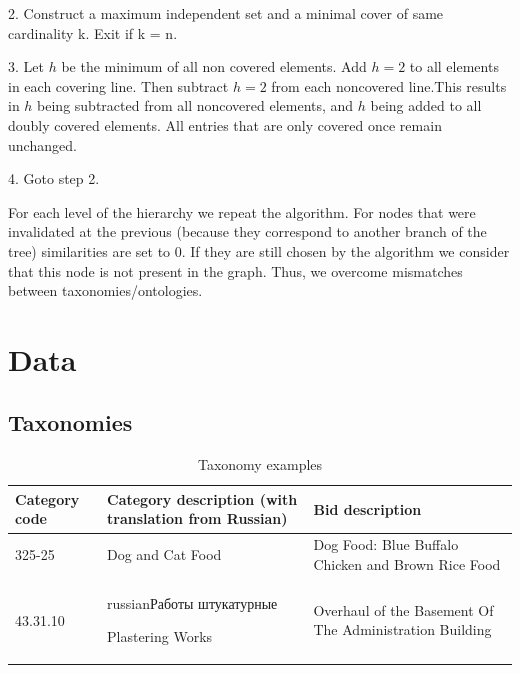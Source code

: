 \documentclass[11pt,a4paper]{article}
\begin{document}
2. Construct a maximum independent set and a minimal cover of same cardinality k. Exit if k = n.

3. Let $h$ be the minimum of all non covered elements. Add $h=2$ to all elements in each covering line. Then subtract $h=2$ from each noncovered line.This results in $h$ being subtracted from all noncovered elements, and $h$ being added to all doubly covered elements. All entries that are only covered once remain unchanged.

4. Goto step 2.

For each level of the hierarchy we repeat the algorithm. For nodes that were invalidated at the previous (because they correspond to another branch of the tree) similarities are set to 0. If they are still chosen by the algorithm we consider that this node is not present in the graph. Thus, we overcome mismatches between taxonomies/ontologies.
%

\section{Data}
\subsection{Taxonomies}

\begin{center}
	\begin{table}[!htbp]
		\small
		\caption{Taxonomy examples}
		\label{table-taxonomies}
                \centering
                \begin{tabular}{|p{1cm}|p{2.5cm}|p{2.5cm}|}
                        \hline
                        Category code & Category description \newline (with translation from Russian) & Bid description\\
                        \hline
                        325-25 & Dog and Cat Food & Dog Food: Blue Buffalo Chicken and Brown Rice Food\\
                        \hline
                        43.31.10 & \begin{otherlanguage*}{russian}Работы штукатурные\end{otherlanguage*} \newline Plastering Works & Overhaul of the Basement Of The Administration Building\\
                        \hline
                \end{tabular}
        \end{table}
\end{center}
\end{document}
